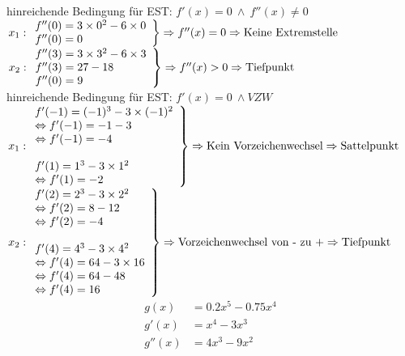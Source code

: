 \documentclass[arbeitsmappe.tex]{subfiles}
\begin{document}
    hinreichende Bedingung für EST: $f'(x) = 0\ \land\ f''(x)\ne 0$ \\
    $\left.
    x_1:
    \begin{array}{ll}
        f''(0) = 3 \times 0^2 - 6 \times 0 \\
        f''(0) = 0                         \\
    \end{array}
    \right\} \Rightarrow \text{$f''(x) = 0$} \Rightarrow \text{Keine Extremstelle} \\
    $
    $\left.
    x_2:
    \begin{array}{ll}
        f''(3) = 3 \times 3^2 - 6 \times 3 \\
        f''(3) = 27-18                     \\
        f''(0) = 9                         \\
    \end{array}
    \right\} \Rightarrow \text{$f''(x) > 0$} \Rightarrow \text{Tiefpunkt} \\
    $
    \\
    hinreichende Bedingung für EST: $f'(x) = 0\ \land VZW$
    \\
    $\left.
    x_1:
    \begin{array}{ll}
        f'(-1) = (-1)^3 - 3\times (-1)^2 \\
        \Leftrightarrow f'(-1) = -1-3    \\
        \Leftrightarrow f'(-1) = -4      \\
        \\
        f'(1) = 1^3 - 3\times 1^2 \\
        \Leftrightarrow f'(1) = -2 \\
    \end{array}
    \right\} \Rightarrow \text{Kein Vorzeichenwechsel} \Rightarrow \text{Sattelpunkt} \\
    $
    \\[1cm]
    $\left.
    x_2:
    \begin{array}{ll}
        f'(2) = 2^3 - 3\times 2^2                \\
        \Leftrightarrow f'(2) = 8 - 12           \\
        \Leftrightarrow f'(2) = -4               \\
        \\
        f'(4) = 4^3 - 3\times 4^2 \\
        \Leftrightarrow f'(4) = 64 - 3 \times 16 \\
        \Leftrightarrow f'(4) = 64 - 48 \\
        \Leftrightarrow f'(4) = 16 \\
    \end{array}
    \right\} \Rightarrow \text{Vorzeichenwechsel von - zu +} \Rightarrow \text{Tiefpunkt} \\
    $
    \\
    \begin{align*}
        g(x) &= 0.2x^5 - 0.75x^4 \\
        g'(x) &= x^4 - 3x^3 \\
        g''(x) &= 4x^3 - 9x^2
    \end{align*}
\end{document}
